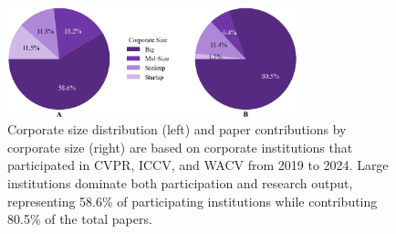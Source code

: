 \documentclass{article}
\begin{document}
\begin{figure}[ht]
  \centering
  \includegraphics[width=0.75\textwidth]{report/images/pie_charts.png}  
  \caption{Corporate size distribution (left) and paper contributions by corporate size (right) are based on corporate institutions that participated in CVPR, ICCV, and WACV from 2019 to 2024. Large institutions dominate both participation and research output, representing 58.6\% of participating institutions while contributing 80.5\% of the total papers.}
  \label{fig:corporate_size_graph}
\end{figure}

\vspace{-10pt}
\end{document}
